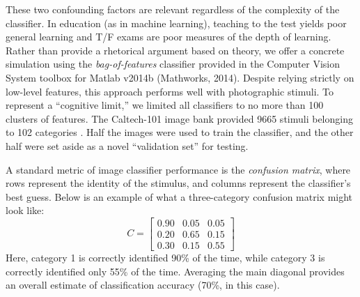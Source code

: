 \documentclass[fleqn,10pt]{wlpeerj_noabs}
\begin{document}
These two confounding factors are relevant regardless of the complexity of the classifier. In education (as in machine learning), teaching to the test yields poor general learning and T/F exams are poor measures of the depth of learning. Rather than provide a rhetorical argument based on theory, we offer a concrete simulation using the \textsl{bag-of-features} classifier \citep{OHara2011} provided in the Computer Vision System toolbox for Matlab v2014b (Mathworks, 2014). Despite relying strictly on low-level features, this approach performs well with photographic stimuli. To represent a ``cognitive limit,'' we limited all classifiers to no more than 100 clusters of features. The Caltech-101 image bank provided 9665 stimuli belonging to 102 categories \citep{Fei2007}. Half the images were used to train the classifier, and the other half were set aside as a novel ``validation set'' for testing. 

A standard metric of image classifier performance is the \textsl{confusion matrix}, where rows represent the identity of the stimulus, and columns represent the classifier's best guess. Below is an example of what a three-category confusion matrix might look like:
\begin{equation*}
C = \begin{bmatrix}
	0.90	&	0.05	&	0.05 \\
	0.20	&	0.65	&	0.15 \\
	0.30	&	0.15	&	0.55
\end{bmatrix}
\end{equation*}
Here, category 1 is correctly identified 90\% of the time, while category 3 is correctly identified only 55\% of the time. Averaging the main diagonal provides an overall estimate of classification accuracy (70\%, in this case).

\end{document}
